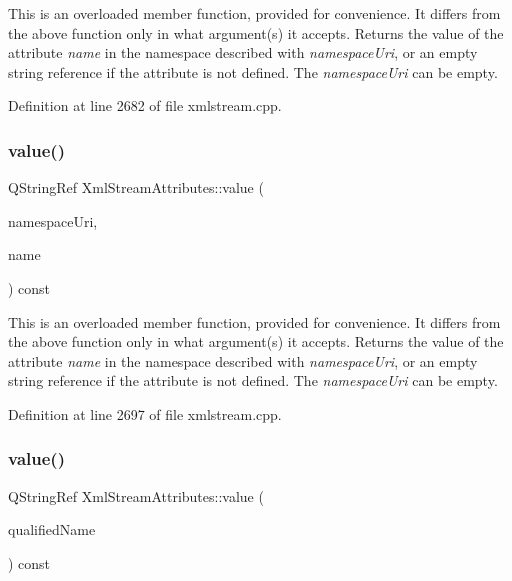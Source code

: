 This is an overloaded member function, provided for convenience. It differs from the above function only in what argument(s) it accepts. Returns the value of the attribute {\itshape name} in the namespace described with {\itshape namespace\+Uri}, or an empty string reference if the attribute is not defined. The {\itshape namespace\+Uri} can be empty. 

Definition at line 2682 of file xmlstream.\+cpp.

\mbox{\label{class_xml_stream_attributes_ac782842988173fa01be24dd38c7c4605}} 
\subsubsection{\texorpdfstring{value()}{value()}\hspace{0.1cm}{\footnotesize\ttfamily [3/5]}}
{\footnotesize\ttfamily Q\+String\+Ref Xml\+Stream\+Attributes\+::value (\begin{DoxyParamCaption}\item[{Q\+Latin1\+String}]{namespace\+Uri,  }\item[{Q\+Latin1\+String}]{name }\end{DoxyParamCaption}) const}

This is an overloaded member function, provided for convenience. It differs from the above function only in what argument(s) it accepts. Returns the value of the attribute {\itshape name} in the namespace described with {\itshape namespace\+Uri}, or an empty string reference if the attribute is not defined. The {\itshape namespace\+Uri} can be empty. 

Definition at line 2697 of file xmlstream.\+cpp.

\mbox{\label{class_xml_stream_attributes_adeb02e3a2e49bbf7a32066fe6780016b}} 
\subsubsection{\texorpdfstring{value()}{value()}\hspace{0.1cm}{\footnotesize\ttfamily [4/5]}}
{\footnotesize\ttfamily Q\+String\+Ref Xml\+Stream\+Attributes\+::value (\begin{DoxyParamCaption}\item[{const Q\+String \&}]{qualified\+Name }\end{DoxyParamCaption}) const}

